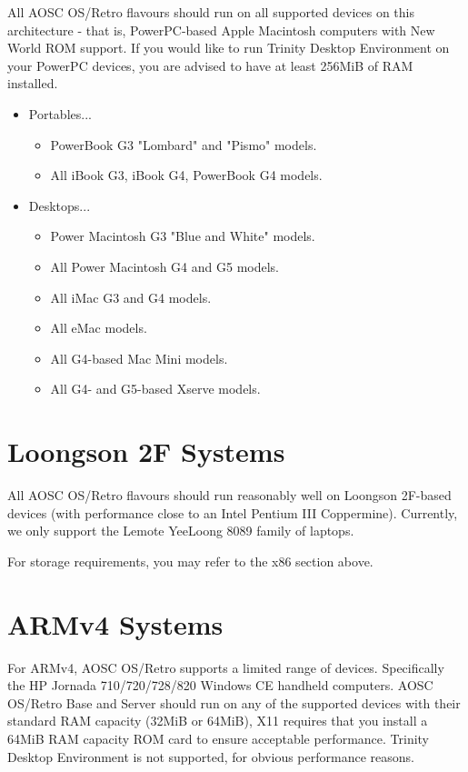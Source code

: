     All AOSC OS/Retro flavours should run on all supported devices on this architecture - that is, PowerPC-based Apple Macintosh computers with New World ROM support. If you would like to run Trinity Desktop Environment on your PowerPC devices, you are advised to have at least 256MiB of RAM installed.

    \begin{itemize}
    \item Portables...
        \begin{itemize}
        \item PowerBook G3 "Lombard" and "Pismo" models.
        \item All iBook G3, iBook G4, PowerBook G4 models.
        \end{itemize}
    \item Desktops...
        \begin{itemize}
        \item Power Macintosh G3 "Blue and White" models.
        \item All Power Macintosh G4 and G5 models.
        \item All iMac G3 and G4 models.
        \item All eMac models.
        \item All G4-based Mac Mini models.
        \item All G4- and G5-based Xserve models.
        \end{itemize}
    \end{itemize}

    \section{Loongson 2F Systems}

    All AOSC OS/Retro flavours should run reasonably well on Loongson 2F-based devices
    (with performance close to an Intel Pentium III Coppermine).
    Currently, we only support the Lemote YeeLoong 8089 family of laptops.

    For storage requirements, you may refer to the x86 section above.

    \section{ARMv4 Systems}

    For ARMv4, AOSC OS/Retro supports a limited range of devices.
    Specifically the HP Jornada 710/720/728/820 Windows CE handheld computers.
    AOSC OS/Retro Base and Server should run on any of the supported devices with their standard RAM capacity (32MiB or 64MiB),
    X11 requires that you install a 64MiB RAM capacity ROM card to ensure acceptable performance.
    Trinity Desktop Environment is not supported, for obvious performance reasons.

